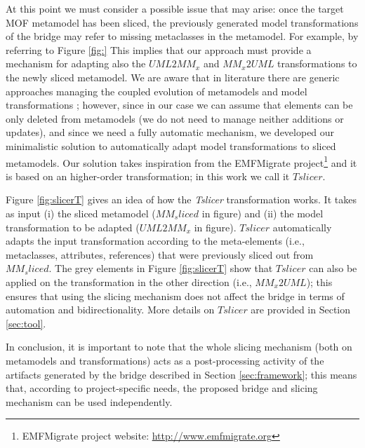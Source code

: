 At this point we must consider a possible issue that may arise: once the target MOF metamodel has been sliced, the
previously generated model transformations of the bridge may refer to missing metaclasses in the metamodel.
For example, by referring to Figure \ref{fig:} 
This implies that our approach must provide a mechanism for adapting also the $UML2MM_x$ and $MM_x2UML$ transformations
to the newly sliced metamodel.
We are aware that in literature there are generic approaches managing the coupled evolution of metamodels and model transformations
\cite{TransEvolution}; however, since in our case we can assume that elements
can be only deleted from metamodels (we do not need to manage neither additions or updates), and since we need a fully automatic mechanism, we developed our minimalistic solution to automatically adapt model transformations to sliced metamodels.
Our solution takes inspiration from the EMFMigrate project\footnote{EMFMigrate project website: \small{\url{http://www.emfmigrate.org}}}
and it is based on an higher-order transformation; in this work we call it $Tslicer$.

Figure \ref{fig:slicerT} gives an idea of how the \textit{Tslicer} transformation works. It takes as input (i) the sliced metamodel
($MM_sliced$ in figure) and (ii) the model transformation to be adapted ($UML2MM_x$ in figure). $Tslicer$ automatically adapts the input transformation according to the meta-elements (i.e., metaclasses, attributes, references)
that were previously sliced out from $MM_sliced$. The grey elements in Figure \ref{fig:slicerT} show that $Tslicer$ can also be
applied on the transformation in the other direction (i.e., $MM_x2UML$); this ensures that using the slicing mechanism does not affect
the bridge in terms of automation and bidirectionality. More details on $Tslicer$ are provided in Section \ref{sec:tool}.

In conclusion, it is important to note that the whole slicing mechanism (both on metamodels and transformations)
acts as a post-processing activity of the artifacts generated by the bridge described in Section \ref{sec:framework}; this means that, according to project-specific needs, the proposed bridge and slicing mechanism can be used independently.


